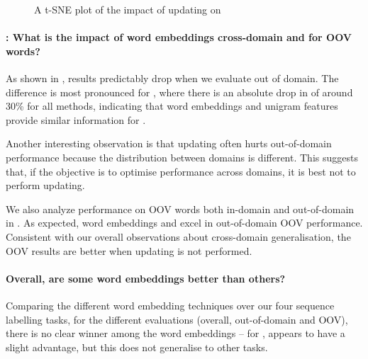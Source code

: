 \begin{figure}[t!]
\begin{subfigure}[b]{0.48\textwidth}
	\subcaption{\ner}
	\label{fig:skippos}	
\end{subfigure}
\caption{A t-SNE plot of the impact of updating on \Skipgram}
\label{fig:vectorfield}
\end{figure}


\paragraph{\RQ[4]: What is the impact of word embeddings cross-domain
  and for OOV words?}
As shown in , results predictably drop when we
evaluate out of domain.
The difference is most pronounced for \chunking, where there is an
absolute drop in \fscore of around 30\% for all methods, indicating that
word embeddings and unigram features provide similar information for
\chunking. 

Another interesting observation is that updating often hurts
out-of-domain performance because the distribution between domains is different. 
This suggests that, if the objective is to optimise performance across
domains, it is best not to perform updating. 

We also analyze performance on OOV words both in-domain and
out-of-domain in .
As expected, word embeddings and \brown excel in out-of-domain OOV performance.
Consistent with our overall observations about cross-domain
generalisation, the OOV results are better when updating is not performed. 

\paragraph{\RQ[5] Overall, are some word embeddings better than others?}
Comparing the different word embedding techniques over our four sequence
labelling tasks, for the different evaluations (overall, out-of-domain
and OOV), there is no clear winner among the word embeddings -- for
\pos, \Skipgram appears to have a slight advantage, but this does not
generalise to other tasks.\\

